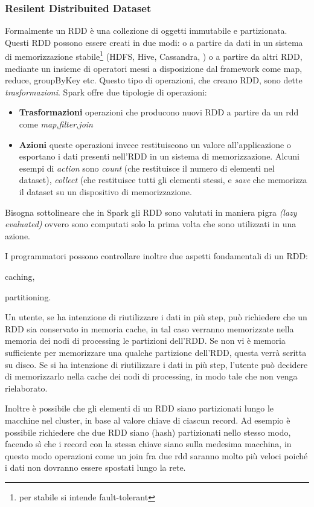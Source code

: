 \subsubsection{Resilent Distribuited Dataset}
Formalmente un RDD è una collezione di oggetti immutabile e partizionata.
Questi RDD possono essere creati in due modi: o a partire da dati in un sistema di memorizzazione stabile\footnote{per stabile si intende fault-tolerant} (HDFS, Hive, Cassandra, ) o a partire da altri RDD, mediante un insieme di operatori messi a disposizione dal framework come map, reduce, groupByKey etc. 
Questo tipo di  operazioni, che creano RDD, sono dette \emph{trasformazioni}. Spark offre due tipologie di operazioni:
\begin{itemize}
\item \textbf{Trasformazioni} operazioni che producono nuovi RDD a partire da un rdd come \emph{map,filter,join}
\item \textbf{Azioni} queste operazioni invece restituiscono un valore all'applicazione o esportano i dati presenti nell'RDD in un sistema di memorizzazione.
Alcuni esempi di \emph{action} sono \emph{count} (che restituisce il numero di elementi nel dataset), \emph{collect} (che restituisce tutti gli elementi stessi, e \emph{save} che  memorizza il dataset su un dispositivo di memorizzazione.
\end{itemize}
Bisogna sottolineare che in Spark gli RDD  sono valutati in maniera pigra \emph{(lazy evaluated)} ovvero sono computati solo la prima volta che sono utilizzati in una azione.
 

I programmatori possono controllare inoltre due aspetti fondamentali di un RDD: 
\begin{inlinelist}
  \item caching,
  \item partitioning.
\end{inlinelist}
 Un utente, se  ha intenzione di riutilizzare i dati in più step, può richiedere che un RDD sia conservato in memoria cache, in tal caso verranno memorizzate nella memoria dei nodi di processing le partizioni dell'RDD.  Se  non vi è memoria sufficiente per memorizzare una qualche partizione dell'RDD, questa verrà scritta su disco.
Se si ha intenzione di riutilizzare i dati in più step, l'utente può decidere di memorizzarlo nella cache dei nodi di processing, in modo tale che non venga  rielaborato. 

 

Inoltre è possibile che gli elementi di un RDD siano partizionati lungo le macchine nel cluster, in base al valore chiave di ciascun record. Ad esempio è possibile richiedere che due RDD siano (hash) partizionati nello stesso modo, facendo sì che i record con la stessa chiave siano sulla medesima macchina, in questo modo operazioni come un join fra due rdd 
saranno molto più veloci poiché i dati non dovranno essere spostati lungo la rete.
 
